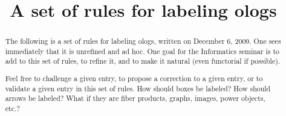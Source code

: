 \documentclass{amsart}
\begin{document}
\title{A set of rules for labeling ologs}

\maketitle

\begin{abstract}

The following is a set of rules for labeling ologs, written on December 6, 2009.  One sees immediately that it is unrefined and ad hoc.  One goal for the Informatics seminar is to add to this set of rules, to refine it, and to make it natural (even functorial if possible). 

Feel free to challenge a given entry, to propose a correction to a given entry, or to validate a given entry in this set of rules.   How should boxes be labeled?  How should arrows be labeled?  What if they are fiber products, graphs, images, power objects, etc.?  

\end{abstract}
\end{document}
